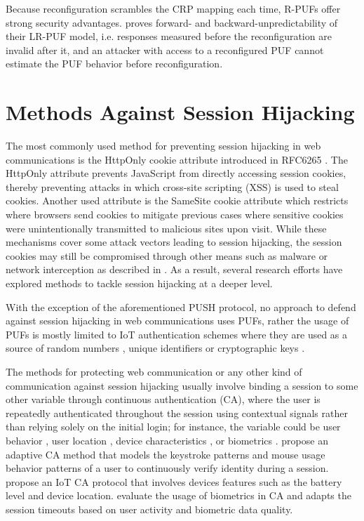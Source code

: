 Because reconfiguration scrambles the CRP mapping each time, R-PUFs offer strong security advantages. \cite{10.1007/978-3-642-23951-9_25} proves forward- and backward-unpredictability of their LR-PUF model, i.e. responses measured before the reconfiguration are invalid after it, and an attacker with access to a reconfigured PUF cannot estimate the PUF behavior before reconfiguration.


\section{Methods Against Session Hijacking}
The most commonly used method for preventing session hijacking in web communications is the HttpOnly cookie attribute introduced in RFC6265 \cite{rfc6265}. The HttpOnly attribute prevents JavaScript from directly accessing session cookies, thereby preventing attacks in which cross-site scripting (XSS) is used to steal cookies. Another used attribute is the SameSite cookie attribute \cite{ietf_rfc6265bis_draft} which restricts where browsers send cookies to mitigate previous cases where sensitive cookies were unintentionally transmitted to malicious sites upon visit. While these mechanisms cover some attack vectors leading to session hijacking, the session cookies may still be compromised through other means such as malware \cite{tyler2025browsercontrolsprotectcookies, cookieMiner_unit42_2019} or network interception \cite{evilginx2_kgretzky_2024} as described in \cite{mitre_t1539}. As a result, several research efforts have explored methods to tackle session hijacking at a deeper level.

With the exception of the aforementioned PUSH protocol, no approach to defend against session hijacking in web communications uses PUFs, rather the usage of PUFs is mostly limited to IoT authentication schemes where they are used as a source of random numbers \cite{10.1007/978-3-540-88625-9_3}, unique identifiers \cite{9557280} or cryptographic keys \cite{10538739, 10007641}. 

The methods for protecting web communication or any other kind of communication against session hijacking usually involve binding a session to some other variable through continuous authentication (CA), where the user is repeatedly authenticated throughout the session using contextual signals rather than relying solely on the initial login; for instance, the variable could be user behavior \cite{6879297, 8757539}, user location \cite{5692487}, device characteristics \cite{9530399}, or biometrics \cite{https://doi.org/10.1002/widm.1365, 8010662, 6424854}. \cite{8757539} propose an adaptive CA method that models the keystroke patterns and mouse usage behavior patterns of a user to continuously verify identity during a session. \cite{9530399} propose an IoT CA protocol that involves devices features such as the battery level and device location. \cite{6424854} evaluate the usage of biometrics in CA and adapts the session timeouts based on user activity and biometric data quality. 

